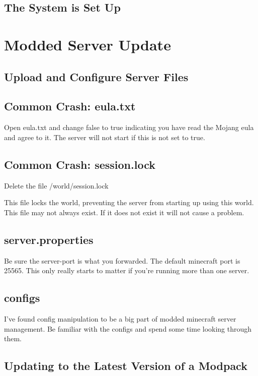 \documentclass{article}
\begin{document}
\label{sec:NotFresh}
\subsection{The System is Set Up}

\section{Modded Server Update}

\subsection{Upload and Configure Server Files}

\subsection{Common Crash: eula.txt}
Open eula.txt and change false to true indicating you have read the Mojang eula and agree to it. The server will not start if this is not set to true.

\subsection{Common Crash: session.lock}
Delete the file /world/session.lock

This file locks the world, preventing the server from starting up using this world. This file may not always exist. If it does not exist it will not cause a problem.

\subsection{server.properties}
Be sure the server-port is what you forwarded. The default minecraft port is 25565. This only really starts to matter if you're running more than one server.

\subsection{configs}
I've found config manipulation to be a big part of modded minecraft server management. Be familiar with the configs and spend some time looking through them.

\subsection{Updating to the Latest Version of a Modpack}
\end{document}
